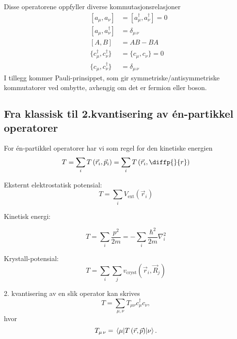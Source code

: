 Disse operatorene oppfyller diverse kommutasjonsrelasjoner
\begin{align}
&[a_\mu, a_{\nu}] & = [a_\mu^\dagger, a_{\nu}^\dagger] = 0 \\
&[a_\mu, a_{\nu}^\dagger] & = \delta_{\mu\,\nu} \\
&[A,B] &= AB-BA \\
&\{c_\mu^\dagger, c_{\nu}^\dagger\} & = \{c_\mu, c_{\nu}\} = 0 \\
&\{c_\mu, c_{\nu}^\dagger\} & = \delta_{\mu\,\nu} 
\end{align}
I tillegg kommer Pauli-prinsippet, som gir symmetriske/antisymmetriske kommutatorer ved ombytte, avhengig om det er fermion eller boson. 

\subsection{Fra klassisk til 2.kvantisering av én-partikkel operatorer}

For én-partikkel operatorer har vi som regel for den kinetiske energien
\begin{equation}
T = \sum_i T\left(\vec{r}_i, \vec{p}_i\right) = \sum_i T\left(\vec{r}_i, \diffp{}{r}\right)
\end{equation}
\begin{theorem}
Eksternt elektrostatisk potensial:
\begin{equation}
T = \sum_i V_{\text{ext}}\left(\vec{r}_i\right)
\end{equation}
\end{theorem}
\begin{theorem}

Kinetisk energi:

\begin{equation}
T = \sum_i \frac{p^2}{2m} = -\sum_i \frac{\hbar^2}{2m}\nabla_i^2
\end{equation}
\end{theorem}

\begin{theorem}
Krystall-potensial:
\begin{equation}
T = \sum_i \sum_j v_{\text{cryst}} \left( \vec{r}_i, \vec{R}_j \right)
\end{equation}
\end{theorem}

2. kvantisering av en slik operator kan skrives
\begin{equation}
T = \sum_{\mu, \nu} T_{\mu\nu}c_\mu^\dagger c_{\nu},
\end{equation}
hvor 
\begin{equation}
T_{\mu\,\nu} = \mel{\mu}{T\left(\vec{r}, \vec{p}\right)}{\nu}.	
\end{equation}

